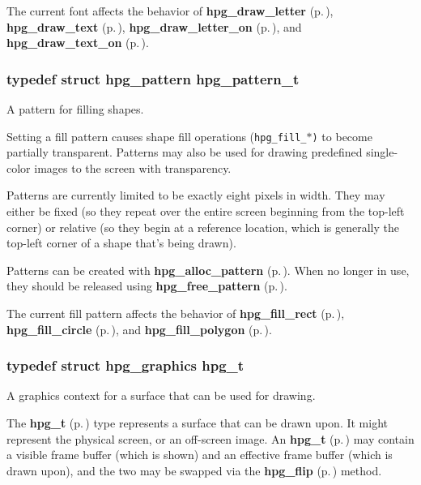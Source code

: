 The current font affects the behavior of {\bf hpg\_\-draw\_\-letter} {\rm (p.\,\pageref{hpgraphics_8h_a59})}, {\bf hpg\_\-draw\_\-text} {\rm (p.\,\pageref{hpgraphics_8h_a61})}, {\bf hpg\_\-draw\_\-letter\_\-on} {\rm (p.\,\pageref{hpgraphics_8h_a58})}, and {\bf hpg\_\-draw\_\-text\_\-on} {\rm (p.\,\pageref{hpgraphics_8h_a60})}. 
\subsubsection{\setlength{\rightskip}{0pt plus 5cm}typedef struct hpg\_\-pattern hpg\_\-pattern\_\-t}\label{hpgraphics_8h_a26}


A pattern for filling shapes.

Setting a fill pattern causes shape fill operations ({\tt hpg\_\-fill\_\-$\ast$)} to become partially transparent. Patterns may also be used for drawing predefined single-color images to the screen with transparency.

Patterns are currently limited to be exactly eight pixels in width. They may either be fixed (so they repeat over the entire screen beginning from the top-left corner) or relative (so they begin at a reference location, which is generally the top-left corner of a shape that's being drawn).

Patterns can be created with {\bf hpg\_\-alloc\_\-pattern} {\rm (p.\,\pageref{hpgraphics_8h_a70})}. When no longer in use, they should be released using {\bf hpg\_\-free\_\-pattern} {\rm (p.\,\pageref{hpgraphics_8h_a71})}.

The current fill pattern affects the behavior of {\bf hpg\_\-fill\_\-rect} {\rm (p.\,\pageref{hpgraphics_8h_a47})}, {\bf hpg\_\-fill\_\-circle} {\rm (p.\,\pageref{hpgraphics_8h_a51})}, and {\bf hpg\_\-fill\_\-polygon} {\rm (p.\,\pageref{hpgraphics_8h_a55})}. 
\subsubsection{\setlength{\rightskip}{0pt plus 5cm}typedef struct hpg\_\-graphics hpg\_\-t}\label{hpgraphics_8h_a24}


A graphics context for a surface that can be used for drawing.

The {\bf hpg\_\-t} {\rm (p.\,\pageref{hpgraphics_8h_a24})} type represents a surface that can be drawn upon. It might represent the physical screen, or an off-screen image. An {\bf hpg\_\-t} {\rm (p.\,\pageref{hpgraphics_8h_a24})} may contain a visible frame buffer (which is shown) and an effective frame buffer (which is drawn upon), and the two may be swapped via the {\bf hpg\_\-flip} {\rm (p.\,\pageref{hpgraphics_8h_a34})} method.

